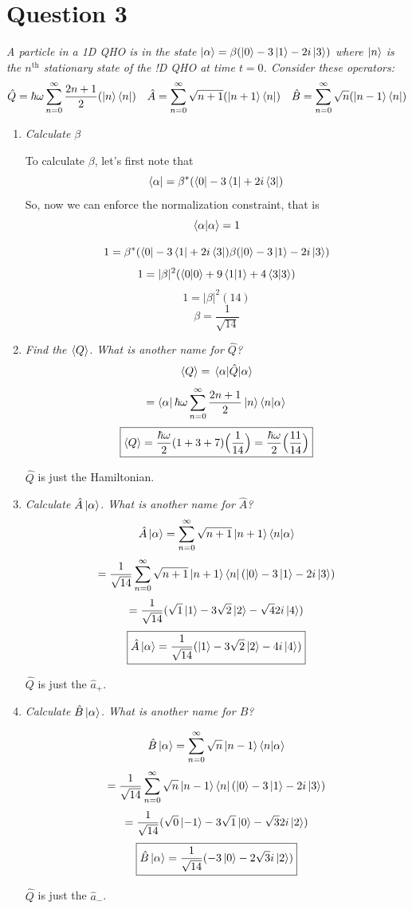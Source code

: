 \documentclass[12pt]{article}
\begin{document}
\newpage

\section*{Question 3}
\emph{A particle in a 1D QHO is in the state $\ket{\alpha} = \beta(\ket{0} - 3\ket{1} - 2i\ket{3})$ where $\ket{n}$ is the $n^\text{th}$ stationary state of the !D QHO at time $t=0$.
Consider these operators:}
\[\hat{Q} = \hbar \omega \sum_{n=0}^\infty \frac{2n+1}{2}(\ket{n}\bra{n}) \quad \hat{A} = \sum_{n=0}^\infty \sqrt{n+1}(\ket{n+1}\bra{n}) \quad \hat{B}=\sum_{n=0}^\infty \sqrt{n}(\ket{n-1}\bra{n})\]

\begin{enumerate}[label=\alph*)]
\item \emph{Calculate $\beta$}

To calculate $\beta$, let's first note that
\[\bra{\alpha} = \beta^* (\bra{0} - 3\bra{1} + 2i \bra{3})\]
So, now we can enforce the normalization constraint, that is
\[\braket{\alpha}{\alpha} = 1\]

\[1 = \beta^* (\bra{0} - 3\bra{1} + 2i \bra{3})\beta(\ket{0} - 3\ket{1} - 2i\ket{3})\]
\[1 = |\beta|^2 (\braket{0}{0} + 9\braket{1}{1} + 4\braket{3}{3})\]
\[1 = |\beta|^2 (14)\]
\[\boxed{\beta = \frac{1}{\sqrt{14}}}\]

\item \emph{Find the $\ev{Q}$. What is another name for $\hat{Q}$?}
\[\ev{Q} = \ev{\hat{Q}}{\alpha}\]
\[= \bra{\alpha}\hbar \omega \sum_{n=0}^\infty \frac{2n+1}{2}\ket{n}\braket{n}{\alpha}\]
\[\boxed{\ev{Q}=\frac{\hbar \omega}{2}(1+3+7)\Big(\frac{1}{14}\Big) = \frac{\hbar \omega}{2}\Big(\frac{11}{14}\Big)}\]

$\hat{Q}$ is just the Hamiltonian.

\item \emph{Calculate $\hat{A}\ket{\alpha}$. What is another name for $\hat{A}$?}
\[\hat{A}\ket{\alpha} = \sum_{n=0}^\infty \sqrt{n+1}\ket{n+1}\braket{n}{\alpha}\]
\[= \frac{1}{\sqrt{14}}\sum_{n=0}^\infty \sqrt{n+1} \ket{n+1}\bra{n}(\ket{0} - 3\ket{1} - 2i\ket{3})\]
\[= \frac{1}{\sqrt{14}}(\sqrt{1}\ket{1} - 3\sqrt{2}\ket{2} - \sqrt{4}2i \ket{4})\]
\[\boxed{\hat{A}\ket{\alpha}= \frac{1}{\sqrt{14}}(\ket{1} - 3\sqrt{2}\ket{2} - 4i \ket{4})}\]

$\hat{Q}$ is just the $\hat{a}_+$.


\item \emph{Calculate $\hat{B}\ket{\alpha}$. What is another name for $\hat{B}$?}

\[\hat{B}\ket{\alpha} = \sum_{n=0}^\infty \sqrt{n}\ket{n-1}\braket{n}{\alpha}\]
\[= \frac{1}{\sqrt{14}}\sum_{n=0}^\infty \sqrt{n}\ket{n-1}\bra{n}(\ket{0} - 3\ket{1} - 2i\ket{3})\]
\[= \frac{1}{\sqrt{14}}(\sqrt{0}\ket{-1} - 3\sqrt{1}\ket{0} - \sqrt{3}2i \ket{2})\]
\[\boxed{\hat{B}\ket{\alpha}= \frac{1}{\sqrt{14}}(- 3\ket{0} - 2\sqrt{3}i \ket{2})}\]

$\hat{Q}$ is just the $\hat{a}_-$.
\end{enumerate}
\end{document}
